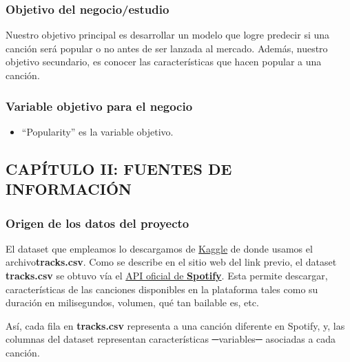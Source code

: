 \documentclass[
  letterpaper,
  DIV=11,
  numbers=noendperiod]{scrartcl}
\providecommand{\tightlist}{%
  \setlength{\itemsep}{0pt}\setlength{\parskip}{0pt}}
\begin{document}
\hypertarget{objetivo-del-negocioestudio}{%
\subsubsection{Objetivo del
negocio/estudio}\label{objetivo-del-negocioestudio}}

Nuestro objetivo principal es desarrollar un modelo que logre predecir
si una canción será popular o no antes de ser lanzada al mercado.
Además, nuestro objetivo secundario, es conocer las características que
hacen popular a una canción.

\hypertarget{variable-objetivo-para-el-negocio}{%
\subsubsection{Variable objetivo para el
negocio}\label{variable-objetivo-para-el-negocio}}

\begin{itemize}
\tightlist
\item
  ``Popularity'' es la variable objetivo.
\end{itemize}

\hypertarget{capuxedtulo-ii-fuentes-de-informaciuxf3n}{%
\subsection{CAPÍTULO II: FUENTES DE
INFORMACIÓN}\label{capuxedtulo-ii-fuentes-de-informaciuxf3n}}

\hypertarget{origen-de-los-datos-del-proyecto}{%
\subsubsection{Origen de los datos del
proyecto}\label{origen-de-los-datos-del-proyecto}}

El dataset que empleamos lo descargamos de
\href{https://www.kaggle.com/datasets/yamaerenay/spotify-dataset-19212020-600k-tracks?resource=download}{Kaggle}
de donde usamos el archivo\textbf{tracks.csv}. Como se describe en el
sitio web del link previo, el dataset \textbf{tracks.csv} se obtuvo vía
el \href{https://developer.spotify.com/documentation/web-api/}{API
oficial de \textbf{Spotify}}. Esta permite descargar, características de
las canciones disponibles en la plataforma tales como su duración en
milisegundos, volumen, qué tan bailable es, etc.

Así, cada fila en \textbf{tracks.csv} representa a una canción diferente
en Spotify, y, las columnas del dataset representan características
─variables─ asociadas a cada canción.
\end{document}
